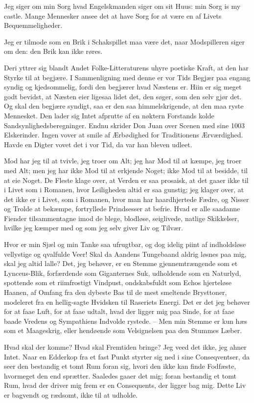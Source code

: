 \documentclass[12pt,a4paper]{article}
\begin{document}
Jeg siger om min Sorg hvad Engelskmanden siger om sit Huus: min Sorg is my castle. Mange Mennesker ansee det at have Sorg for at være en af Livets Bequemmeligheder.

Jeg er tilmode som en Brik i Schakspillet maa være det, naar Modspilleren siger om den: den Brik kan ikke røres.

Deri yttrer sig blandt Andet Folke-Litteraturens uhyre poetiske Kraft, at den har Styrke til at begjære. I Sammenligning med denne er vor Tids Begjær paa engang syndig og kjedsommelig, fordi den begjærer hvad Næstens er. Hiin er sig meget godt bevidst, at Næsten eier ligesaa lidet det, den søger, som den selv gjør det. Og skal den begjære syndigt, saa er den saa himmelskrigende, at den maa ryste Mennesket. Den lader sig Intet afprutte af en nøktern Forstands kolde Sandsynlighedsberegninger. Endnu skrider Don Juan over Scenen med sine 1003 Elskerinder. Ingen vover at smile af Ærbødighed for Traditionens Ærværdighed. Havde en Digter vovet det i vor Tid, da var han bleven udleet.

Mod har jeg til at tvivle, jeg troer om Alt; jeg har Mod til at kæmpe, jeg troer med Alt; men jeg har ikke Mod til at erkjende Noget; ikke Mod til at besidde, til at eie Noget. De Fleste klage over, at Verden er saa prosaisk, at det gaaer ikke til i Livet som i Romanen, hvor Leiligheden altid er saa gunstig; jeg klager over, at det ikke er i Livet, som i Romanen, hvor man har haardhjertede Fædre, og Nisser og Trolde at bekæmpe, fortryllede Prindsesser at befrie. Hvad er alle saadanne Fiender tilsammentagne imod de blege, blodløse, seiglivede, natlige Skikkelser, hvilke jeg kæmper med og som jeg selv giver Liv og Tilvær.

Hvor er min Sjæl og min Tanke saa ufrugtbar, og dog idelig piint af indholdsløse vellystige og qvalfulde Veer! Skal da Aandens Tungebaand aldrig løsnes paa mig, skal jeg altid lalle? Det, jeg behøver, er en Stemme gjennemtrængende som et Lynceus-Blik, forfærdende som Giganternes Suk, udholdende som en Naturlyd, spottende som et riimfrostigt Vindpust, ondskabsfuldt som Echos hjerteløse Haanen, af Omfang fra den dybeste Bas til de mest smeltende Brysttoner, modeleret fra en hellig-sagte Hvidsken til Raseriets Energi. Det er det jeg behøver for at faae Luft, for at faae udtalt, hvad der ligger mig paa Sinde, for at faae baade Vredens og Sympathiens Indvolde rystede. – Men min Stemme er kun hæs som et Maageskrig, eller hendøende som Velsignelsen paa den Stummes Læber.

Hvad skal der komme? Hvad skal Fremtiden bringe? Jeg veed det ikke, jeg ahner Intet. Naar en Edderkop fra et fast Punkt styrter sig ned i sine Conseqventser, da seer den bestandig et tomt Rum foran sig, hvori den ikke kan finde Fodfæste, hvormeget den end sprætter. Saaledes gaaer det mig; foran bestandig et tomt Rum, hvad der driver mig frem er en Consequents, der ligger bag mig. Dette Liv er bagvendt og rædsomt, ikke til at udholde.
\end{document}
